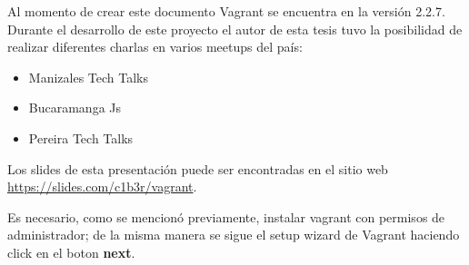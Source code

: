\documentclass[letterpaper, 12pt, oneside]{article}
\begin{document}
    Al momento de crear este documento Vagrant se encuentra en la versión 2.2.7. Durante el desarrollo de este proyecto el autor de esta tesis tuvo la posibilidad de realizar diferentes charlas en varios meetups del país: 
    
    \begin{itemize}
        \item Manizales Tech Talks
        \item Bucaramanga Js
        \item Pereira Tech Talks
    \end{itemize}
    
    Los slides de esta presentación puede ser encontradas en el sitio web  \url{https://slides.com/c1b3r/vagrant}.
    
    Es necesario, como se mencionó previamente, instalar vagrant con permisos de administrador; de la misma manera se sigue el setup wizard de Vagrant haciendo click en el boton \textbf{next}.
\end{document}

